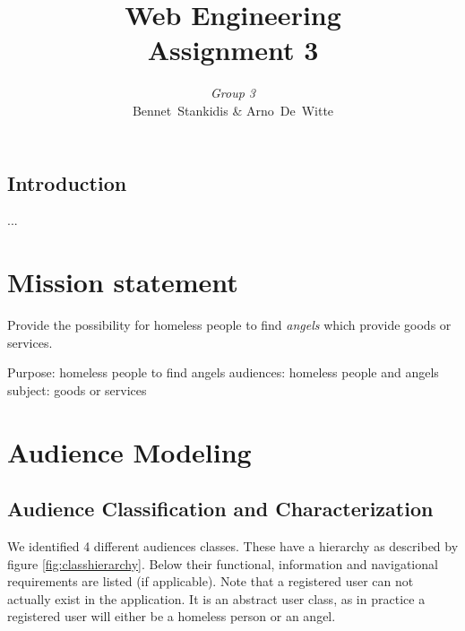 \documentclass[a4paper]{report}
\author{\textit{Group 3}\\ Bennet~Stankidis \& Arno~De~Witte}
\title{{\Huge Web Engineering}\\Assignment 3}
\begin{document}
\maketitlepage
\tableofcontents
\clearpage

\section{Introduction}
...

\chapter{Mission statement}
Provide the possibility for homeless people to find \emph{angels} which provide goods or services.

Purpose: homeless people to find angels
audiences: homeless people and angels
subject: goods or services

\chapter{Audience Modeling}
\section{Audience Classification and Characterization}
We identified 4 different audiences classes. These have a hierarchy as described by figure \ref{fig:classhierarchy}. Below their functional, information and navigational requirements are listed (if applicable). Note that a registered user can not actually exist in the application. It is an abstract user class, as in practice a registered user will either be a homeless person or an angel.
\end{document}
